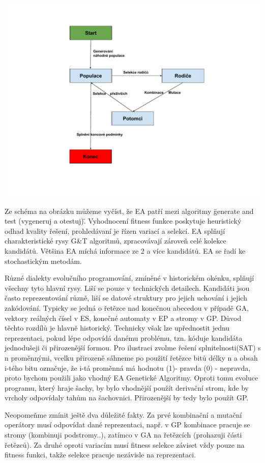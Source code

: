 \begin{center}
\includegraphics[scale=0.63]{../img/EA.pdf}
\end{center}
Ze schéma na obrázku můžeme vyčíst, že EA patří mezi algoritmy \"generate and test (vygeneruj a otestuj)\". Vyhodnocení fitness funkce poskytuje heuristický odhad kvality řešení, prohledávaní je řízen variací a selekcí. EA splňují charakteristické rysy G\&T algoritmů, zpracovávají zároveň celé kolekce kandidátů. Většina EA míchá informace ze 2 a více kandidátů. EA se řadí ke stochastickým metodám. \par
Různé dialekty evolučního programování, zmíněné v historickém okénku, splňují všechny tyto hlavní rysy. Liší se pouze v technických detailech. Kandidáti jsou často reprezentování různě, liší se datové struktury pro jejich uchování i jejich zakódování. Typicky se jedná o řetězce nad konečnou abecedou v případě GA, vektory reálných čísel v ES, konečné automaty v EP a stromy v GP. Důvod těchto rozdílů je hlavně historický. Technicky však lze upřednostit jednu reprezentaci, pokud lépe odpovídá danému problému, tzn. kóduje kandidáta jednodušeji či přirozenější formou. Pro ilustraci zvolme řešení splnitelnosti(SAT) s n proměnnými, vcelku přirozeně sáhneme po použití řetězce bitů délky n a obsah i-tého bitu označuje, že i-tá proměnná má hodnotu (1)- pravda (0) - nepravda, proto bychom použili jako vhodný EA Genetické Algoritmy. Oproti tomu evoluce programu, který hraje šachy, by bylo vhodnější použít derivační strom, kde by vrcholy odpovídaly tahům na šachovnici. Přirozenější by tedy bylo použít GP. \par
Neopomeňme zmínit ještě dva důležité fakty. Za prvé kombinační a mutační operátory musí odpovídat dané reprezentaci, např. v GP kombinace pracuje se stromy (kombinuji podstromy..), zatímco v GA na řetězcích (prohazuji části řetězců). Za druhé oproti variacím musí fitness selekce záviset vždy pouze na fitness funkci, takže selekce pracuje nezávisle na reprezentaci.
